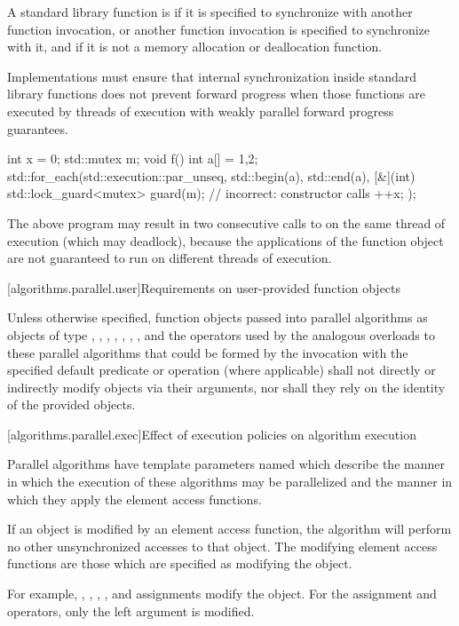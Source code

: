 \pnum
A standard library function is 
if it is specified to synchronize with another function invocation, or
another function invocation is specified to synchronize with it,
and if it is not a memory allocation or deallocation function.
\begin{note}
Implementations must ensure that internal synchronization
inside standard library functions does not prevent forward progress
when those functions are executed by threads of execution
with weakly parallel forward progress guarantees.
\end{note}
\begin{example}
\begin{codeblock}
int x = 0;
std::mutex m;
void f() {
  int a[] = {1,2};
  std::for_each(std::execution::par_unseq, std::begin(a), std::end(a), [&](int) {
    std::lock_guard<mutex> guard(m);            // incorrect:  constructor calls 
  ++x;
  });
}
\end{codeblock}
The above program may result in two consecutive calls to 
on the same thread of execution (which may deadlock),
because the applications of the function object are not guaranteed
to run on different threads of execution.
\end{example}

[algorithms.parallel.user]{Requirements on user-provided function objects}

\pnum
Unless otherwise specified,
function objects passed into parallel algorithms as objects of type
,
,
,
,
,
,
, and
the operators used by the analogous overloads to these parallel algorithms
that could be formed by the invocation
with the specified default predicate or operation (where applicable)
shall not directly or indirectly modify objects via their arguments,
nor shall they rely on the identity of the provided objects.

[algorithms.parallel.exec]{Effect of execution policies on algorithm execution}

\pnum
Parallel algorithms have
template parameters named 
which describe the manner in which the execution of these algorithms may be
parallelized and the manner in which they apply the element access functions.

\pnum
If an object is modified by an element access function,
the algorithm will perform no other unsynchronized accesses to that object.
The modifying element access functions are those
which are specified as modifying the object.
\begin{note}
For example,
,
\tcode{++},
\tcode{--},
, and
assignments
modify the object.
For the assignment and  operators, only the left argument is modified.
\end{note}

